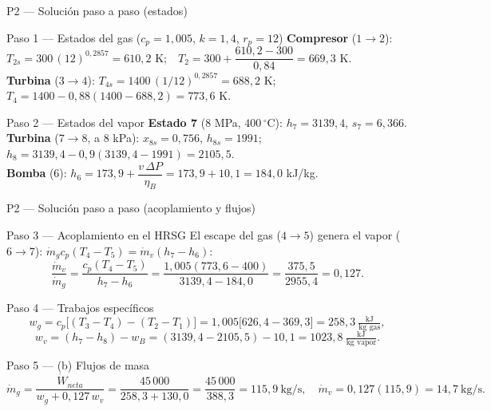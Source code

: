 \documentclass[aspectratio=169,10pt]{beamer}
\begin{document}
\begin{frame}{P2 --- Solución paso a paso (estados)}
\begin{cardgear}{Paso 1 --- Estados del gas ($c_p=1{,}005$, $k=1{,}4$, $r_p=12$)}{\faSuperscript}
{\footnotesize
\textbf{Compresor} ($1\to2$): $T_{2s}=300\,(12)^{0{,}2857}=610{,}2$ K;\ \ $T_2=300+\dfrac{610{,}2-300}{0{,}84}=669{,}3$ K.\\[0.8mm]
\textbf{Turbina} ($3\to4$): $T_{4s}=1400\,(1/12)^{0{,}2857}=688{,}2$ K;\ \ $T_4=1400-0{,}88(1400-688{,}2)=773{,}6$ K.}
\end{cardgear}
\vspace{1.2mm}
\begin{cardidea}{Paso 2 --- Estados del vapor}{\faSuperscript}
{\footnotesize
\textbf{Estado 7} ($8$ MPa, $400\,^\circ$C): $h_7=3139{,}4$, $s_7=6{,}366$.\\[0.6mm]
\textbf{Turbina} ($7\to8$, a $8$ kPa): $x_{8s}=0{,}756$, $h_{8s}=1991$;\ $h_8=3139{,}4-0{,}9(3139{,}4-1991)=2105{,}5$.\\[0.6mm]
\textbf{Bomba} ($6$): $h_6=173{,}9+\dfrac{v\,\Delta P}{\eta_B}=173{,}9+10{,}1=184{,}0$ kJ/kg.}
\end{cardidea}
\end{frame}

\begin{frame}{P2 --- Solución paso a paso (acoplamiento y flujos)}
\begin{cardgear}{Paso 3 --- Acoplamiento en el HRSG}{\faSuperscript}
El escape del gas ($4\to5$) genera el vapor ($6\to7$): $\dot m_g c_p(T_4-T_5)=\dot m_v(h_7-h_6)$:
$$\frac{\dot m_v}{\dot m_g}=\frac{c_p(T_4-T_5)}{h_7-h_6}=\frac{1{,}005(773{,}6-400)}{3139{,}4-184{,}0}=\frac{375{,}5}{2955{,}4}=0{,}127.$$
\end{cardgear}
\vspace{1mm}
\begin{cardidea}{Paso 4 --- Trabajos específicos}{\faSuperscript}
{\footnotesize
$$w_g=c_p\big[(T_3-T_4)-(T_2-T_1)\big]=1{,}005\big[626{,}4-369{,}3\big]=258{,}3\ \tfrac{\text{kJ}}{\text{kg gas}},$$
$$w_v=(h_7-h_8)-w_B=(3139{,}4-2105{,}5)-10{,}1=1023{,}8\ \tfrac{\text{kJ}}{\text{kg vapor}}.$$}
\end{cardidea}
\vspace{1mm}
\begin{cardgear}{Paso 5 --- (b) Flujos de masa}{\faListOl}
{\footnotesize
$$\dot m_g=\frac{\dot W_{neta}}{w_g+0{,}127\,w_v}=\frac{45\,000}{258{,}3+130{,}0}=\frac{45\,000}{388{,}3}=115{,}9\ \text{kg/s},\quad \dot m_v=0{,}127(115{,}9)=14{,}7\ \text{kg/s}.$$}
\end{cardgear}
\end{frame}
\end{document}
